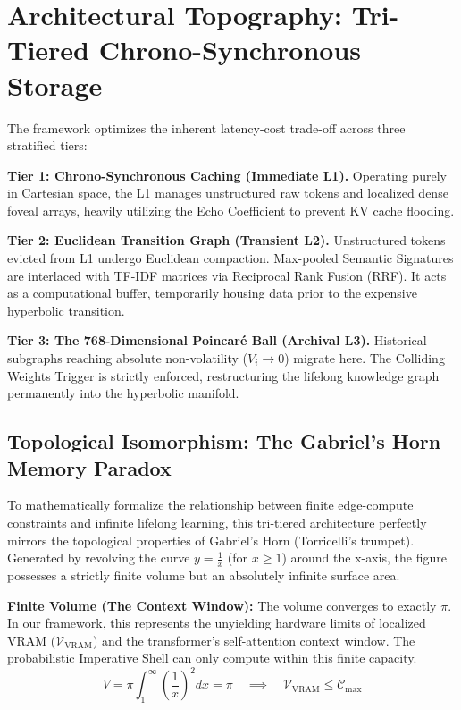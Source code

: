 \documentclass[11pt, a4paper]{article}
\begin{document}
	\section{Architectural Topography: Tri-Tiered Chrono-Synchronous Storage}
	The framework optimizes the inherent latency-cost trade-off across three stratified tiers:
	
	\textbf{Tier 1: Chrono-Synchronous Caching (Immediate L1).} Operating purely in Cartesian space, the L1 manages unstructured raw tokens and localized dense foveal arrays, heavily utilizing the Echo Coefficient to prevent KV cache flooding.
	
	\textbf{Tier 2: Euclidean Transition Graph (Transient L2).} Unstructured tokens evicted from L1 undergo Euclidean compaction. Max-pooled Semantic Signatures are interlaced with TF-IDF matrices via Reciprocal Rank Fusion (RRF). It acts as a computational buffer, temporarily housing data prior to the expensive hyperbolic transition.
    
    \textbf{Tier 3: The 768-Dimensional Poincaré Ball (Archival L3).} Historical subgraphs reaching absolute non-volatility ($V_i \to 0$) migrate here. The Colliding Weights Trigger is strictly enforced, restructuring the lifelong knowledge graph permanently into the hyperbolic manifold.

	\subsection{Topological Isomorphism: The Gabriel's Horn Memory Paradox}
	To mathematically formalize the relationship between finite edge-compute constraints and infinite lifelong learning, this tri-tiered architecture perfectly mirrors the topological properties of Gabriel's Horn (Torricelli's trumpet). Generated by revolving the curve $y = \frac{1}{x}$ (for $x \ge 1$) around the x-axis, the figure possesses a strictly finite volume but an absolutely infinite surface area.
	
	\textbf{Finite Volume (The Context Window):} The volume converges to exactly $\pi$. In our framework, this represents the unyielding hardware limits of localized VRAM ($\mathcal{V}_{\text{VRAM}}$) and the transformer's self-attention context window. The probabilistic Imperative Shell can only compute within this finite capacity.
	\begin{equation}
		V = \pi \int_{1}^{\infty} \left(\frac{1}{x}\right)^2 dx = \pi \quad \implies \quad \mathcal{V}_{\text{VRAM}} \le \mathcal{C}_{\text{max}}
	\end{equation}
	
\end{document}
